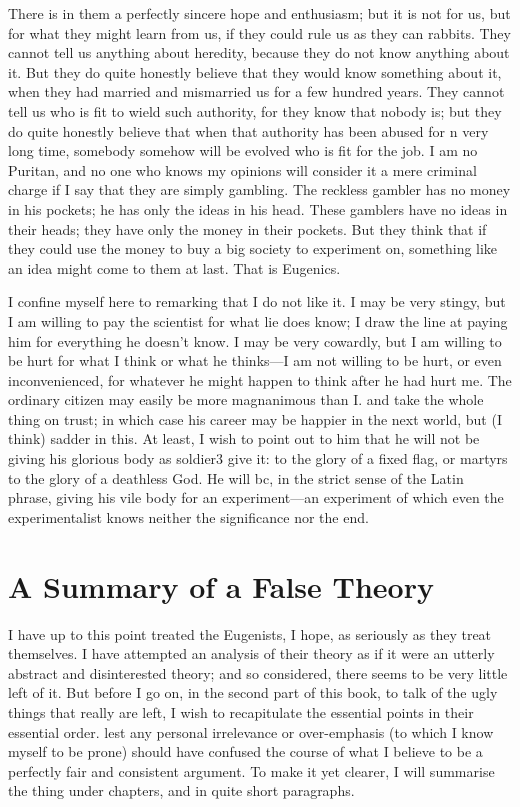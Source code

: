 \documentclass{book}
\begin{document}
There is in them a perfectly sincere hope and enthusiasm; but it is not for us, but for what they might learn from us, if they could rule us as they can rabbits. They cannot tell us anything about heredity, because they do not know anything about it. But they do quite honestly believe that they would know something about it, when they had married and mismarried us for a few hundred years. They cannot tell us who is fit to wield such authority, for they know that nobody is; but they do quite honestly believe that when that authority has been abused for n very long time, somebody somehow will be evolved who is fit for the job. I am no Puritan, and no one who knows my opinions will consider it a mere criminal charge if I say that they are simply gambling. The reckless gambler has no money in his pockets; he has only the ideas in his head. These gamblers have no ideas in their heads; they have only the money in their pockets. But they think that if they could use the money to buy a big society to experiment on, something like an idea might come to them at last. That is Eugenics.

I confine myself here to remarking that I do not like it. I may be very stingy, but I am willing to pay the scientist for what lie does know; I draw the line at paying him for everything he doesn’t know. I may be very cowardly, but I am willing to be hurt for what I think or what he thinks—I am not willing to be hurt, or even inconvenienced, for whatever he might happen to think after he had hurt me. The ordinary citizen may easily be more magnanimous than I. and take the whole thing on trust; in which case his career may be happier in the next world, but (I think) sadder in this. At least, I wish to point out to him that he will not be giving his glorious body as soldier3 give it: to the glory of a fixed flag, or martyrs to the glory of a deathless God. He will bc, in the strict sense of the Latin phrase, giving his vile body for an experiment—an experiment of which even the experimentalist knows neither the significance nor the end.

\chapter{A Summary of a False Theory}
\label{chapter-9}
I have up to this point treated the Eugenists, I hope, as seriously as they treat themselves. I have attempted an analysis of their theory as if it were an utterly abstract and disinterested theory; and so considered, there seems to be very little left of it. But before I go on, in the second part of this book, to talk of the ugly things that really are left, I wish to recapitulate the essential points in their essential order. lest any personal irrelevance or over-emphasis (to which I know myself to be prone) should have confused the course of what I believe to be a perfectly fair and consistent argument. To make it yet clearer, I will summarise the thing under chapters, and in quite short paragraphs.
\end{document}
